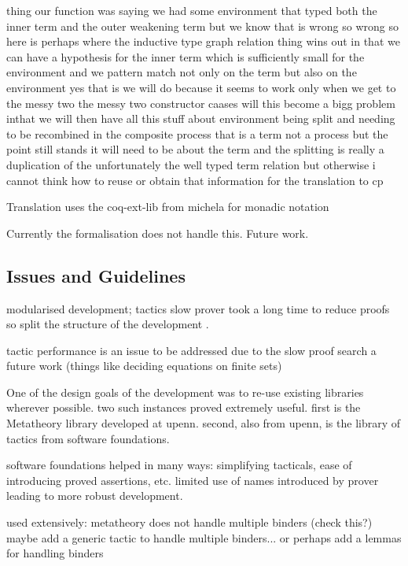 thing our function was saying we had some environment that typed both the
inner term and the outer weakening term but we know that is wrong so wrong so
here is perhaps where the inductive type graph relation thing wins out in that
we can have a hypothesis for the inner term which is sufficiently small for
the environment and we pattern match not only on the term but also on the
environment yes that is we will do because it seems to work only when we get
to the messy two the messy two constructor caases will this become a bigg
problem inthat we will then have all this stuff about environment being split
and needing to be recombined in the composite process that is a term not a
process but the point still stands it will need to be about the term and the
splitting is really a duplication of the unfortunately the well typed term
relation but otherwise i cannot think how to reuse or obtain that information
for the translation to cp

Translation uses the coq-ext-lib from michela for monadic notation

Currently the formalisation does not handle this. Future work.


\subsection{Issues and Guidelines}

modularised development; tactics slow prover took a long time to reduce proofs
so split the structure of the development .

tactic performance is an issue to be addressed due to the slow proof search a
future work (things like deciding equations on finite sets)

One of the design goals of the development was to re-use existing libraries
wherever possible. two such instances proved extremely useful. first is the
Metatheory library developed at upenn. second, also from upenn, is the library
of tactics from software foundations.

software foundations helped in many ways: simplifying tacticals, ease of
introducing proved assertions, etc. limited use of names introduced by prover
leading to more robust development.

used extensively: metatheory does not handle multiple binders (check this?)
maybe add a generic tactic to handle multiple binders... or perhaps add a
lemmas for handling binders

